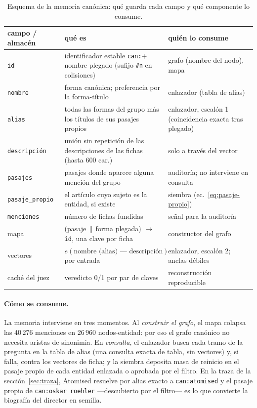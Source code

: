 \documentclass[11pt,a4paper]{article}
\begin{document}
\begin{table}[t]
\centering\footnotesize\setlength{\tabcolsep}{4pt}
\caption{Esquema de la memoria canónica: qué guarda cada campo y qué
componente lo consume.}
\label{tab:memoria}
\begin{tabular}{l>{\raggedright\arraybackslash}p{}>{\raggedright\arraybackslash}p{}}
\toprule
campo / almacén & qué es & quién lo consume\\
\midrule
\texttt{id} & identificador estable \texttt{can:}$+$nombre plegado (sufijo \texttt{\#n} en colisiones) & grafo (nombre del nodo), mapa\\
\texttt{nombre} & forma canónica; preferencia por la forma-título & enlazador (tabla de alias)\\
\texttt{alias} & todas las formas del grupo más los títulos de sus pasajes propios & enlazador, escalón 1 (coincidencia exacta tras plegado)\\
\texttt{descripción} & unión sin repetición de las descripciones de las fichas (hasta 600 car.) & solo a través del vector\\
\texttt{pasajes} & pasajes donde aparece alguna mención del grupo & auditoría; no interviene en consulta\\
\texttt{pasaje\_propio} & el artículo cuyo sujeto es la entidad, si existe & siembra (ec.~\ref{eq:pasaje-propio})\\
\texttt{menciones} & número de fichas fundidas & señal para la auditoría\\
mapa & (pasaje$\,\|\,$forma plegada) $\to$ \texttt{id}, una clave por ficha & constructor del grafo\\
vectores & $e(\text{nombre (alias) --- descripción})$ por entrada & enlazador, escalón 2; anclas débiles\\
caché del juez & veredicto 0/1 por par de claves & reconstrucción reproducible\\
\bottomrule
\end{tabular}
\end{table}

\paragraph{Cómo se consume.}
La memoria interviene en tres momentos. Al \emph{construir el grafo}, el
mapa colapsa las $40\,276$ menciones en $26\,960$ nodos-entidad: por eso
el grafo canónico no necesita aristas de sinonimia. En \emph{consulta}, el
enlazador busca cada tramo de la pregunta en la tabla de alias (una
consulta exacta de tabla, sin vectores) y, si falla, contra los vectores
de ficha; y la siembra deposita masa de reinicio en el pasaje propio de
cada entidad enlazada o aprobada por el filtro. En la traza de la
sección~\ref{sec:traza}, \guillemotleft{}Atomised\guillemotright{} resuelve por alias exacto a
\texttt{can:atomised} y el pasaje propio de \texttt{can:oskar roehler}
---descubierto por el filtro--- es lo que convierte la biografía del
director en semilla.
\end{document}
